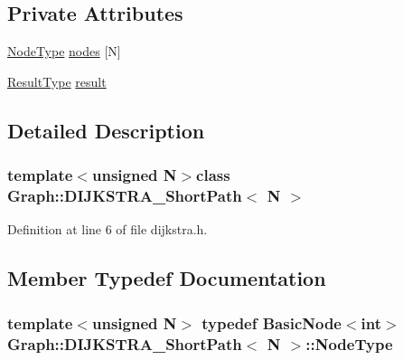 \subsection*{Private Attributes}
\begin{DoxyCompactItemize}
\item 
\hyperlink{class_graph_1_1_d_i_j_k_s_t_r_a___short_path_a0d077fc4311ea53b580be6eaa9f3ea65}{Node\+Type} \hyperlink{class_graph_1_1_d_i_j_k_s_t_r_a___short_path_a410085b088595001d848fb73b4246f8c}{nodes} \mbox{[}N\mbox{]}
\item 
\hyperlink{class_graph_1_1_d_i_j_k_s_t_r_a___short_path_ae91c7c8c41a2052eb4e25f3f5751b1bc}{Result\+Type} \hyperlink{class_graph_1_1_d_i_j_k_s_t_r_a___short_path_a8d1a93cd7e7e2073c51a151145f490d2}{result}
\end{DoxyCompactItemize}


\subsection{Detailed Description}
\subsubsection*{template$<$unsigned N$>$class Graph\+::\+D\+I\+J\+K\+S\+T\+R\+A\+\_\+\+Short\+Path$<$ N $>$}



Definition at line 6 of file dijkstra.\+h.



\subsection{Member Typedef Documentation}
\hypertarget{class_graph_1_1_d_i_j_k_s_t_r_a___short_path_a0d077fc4311ea53b580be6eaa9f3ea65}{}
\subsubsection[{Node\+Type}]{\setlength{\rightskip}{0pt plus 5cm}template$<$unsigned N$>$ typedef Basic\+Node$<$int$>$ {\bf Graph\+::\+D\+I\+J\+K\+S\+T\+R\+A\+\_\+\+Short\+Path}$<$ N $>$\+::{\bf Node\+Type}}\label{class_graph_1_1_d_i_j_k_s_t_r_a___short_path_a0d077fc4311ea53b580be6eaa9f3ea65}


